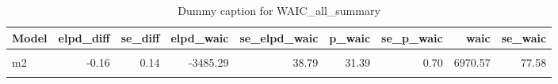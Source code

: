 \begin{table}
\centering
\caption{Dummy caption for WAIC_all_summary}
\centering
\fontsize{10}{12}\selectfont
\begin{tabular}[t]{lrrrrrrrr}
\toprule
Model & elpd\_diff & se\_diff & elpd\_waic & se\_elpd\_waic & p\_waic & se\_p\_waic & waic & se\_waic\\
\midrule
\cellcolor{gray!10}{m3.1} & \cellcolor{gray!10}{0.00} & \cellcolor{gray!10}{0.00} & \cellcolor{gray!10}{-3485.12} & \cellcolor{gray!10}{38.81} & \cellcolor{gray!10}{31.25} & \cellcolor{gray!10}{0.69} & \cellcolor{gray!10}{6970.25} & \cellcolor{gray!10}{77.63}\\
m2 & -0.16 & 0.14 & -3485.29 & 38.79 & 31.39 & 0.70 & 6970.57 & 77.58\\
\cellcolor{gray!10}{m4} & \cellcolor{gray!10}{-2.76} & \cellcolor{gray!10}{1.89} & \cellcolor{gray!10}{-3487.88} & \cellcolor{gray!10}{38.84} & \cellcolor{gray!10}{35.72} & \cellcolor{gray!10}{0.81} & \cellcolor{gray!10}{6975.77} & \cellcolor{gray!10}{77.67}\\
\bottomrule
\end{tabular}
\end{table}
